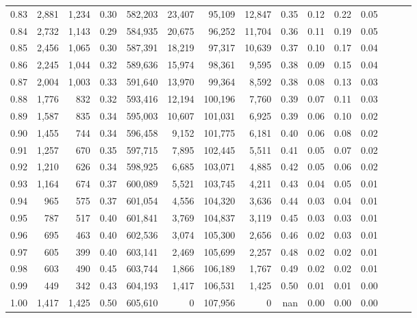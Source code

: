 \begin{tabular}{rrrrrrrrrrrrrrr}
0.83 &   2,881 &  1,234 &  0.30 &  582,203 &   23,407 &   95,109 &   12,847 &  0.35 &  0.12 &  0.22 &      0.05 \\
0.84 &   2,732 &  1,143 &  0.29 &  584,935 &   20,675 &   96,252 &   11,704 &  0.36 &  0.11 &  0.19 &      0.05 \\
0.85 &   2,456 &  1,065 &  0.30 &  587,391 &   18,219 &   97,317 &   10,639 &  0.37 &  0.10 &  0.17 &      0.04 \\
0.86 &   2,245 &  1,044 &  0.32 &  589,636 &   15,974 &   98,361 &    9,595 &  0.38 &  0.09 &  0.15 &      0.04 \\
0.87 &   2,004 &  1,003 &  0.33 &  591,640 &   13,970 &   99,364 &    8,592 &  0.38 &  0.08 &  0.13 &      0.03 \\
0.88 &   1,776 &    832 &  0.32 &  593,416 &   12,194 &  100,196 &    7,760 &  0.39 &  0.07 &  0.11 &      0.03 \\
0.89 &   1,587 &    835 &  0.34 &  595,003 &   10,607 &  101,031 &    6,925 &  0.39 &  0.06 &  0.10 &      0.02 \\
0.90 &   1,455 &    744 &  0.34 &  596,458 &    9,152 &  101,775 &    6,181 &  0.40 &  0.06 &  0.08 &      0.02 \\
0.91 &   1,257 &    670 &  0.35 &  597,715 &    7,895 &  102,445 &    5,511 &  0.41 &  0.05 &  0.07 &      0.02 \\
0.92 &   1,210 &    626 &  0.34 &  598,925 &    6,685 &  103,071 &    4,885 &  0.42 &  0.05 &  0.06 &      0.02 \\
0.93 &   1,164 &    674 &  0.37 &  600,089 &    5,521 &  103,745 &    4,211 &  0.43 &  0.04 &  0.05 &      0.01 \\
0.94 &     965 &    575 &  0.37 &  601,054 &    4,556 &  104,320 &    3,636 &  0.44 &  0.03 &  0.04 &      0.01 \\
0.95 &     787 &    517 &  0.40 &  601,841 &    3,769 &  104,837 &    3,119 &  0.45 &  0.03 &  0.03 &      0.01 \\
0.96 &     695 &    463 &  0.40 &  602,536 &    3,074 &  105,300 &    2,656 &  0.46 &  0.02 &  0.03 &      0.01 \\
0.97 &     605 &    399 &  0.40 &  603,141 &    2,469 &  105,699 &    2,257 &  0.48 &  0.02 &  0.02 &      0.01 \\
0.98 &     603 &    490 &  0.45 &  603,744 &    1,866 &  106,189 &    1,767 &  0.49 &  0.02 &  0.02 &      0.01 \\
0.99 &     449 &    342 &  0.43 &  604,193 &    1,417 &  106,531 &    1,425 &  0.50 &  0.01 &  0.01 &      0.00 \\
1.00 &   1,417 &  1,425 &  0.50 &  605,610 &        0 &  107,956 &        0 &   nan &  0.00 &  0.00 &      0.00 \\
\bottomrule
\end{tabular}
